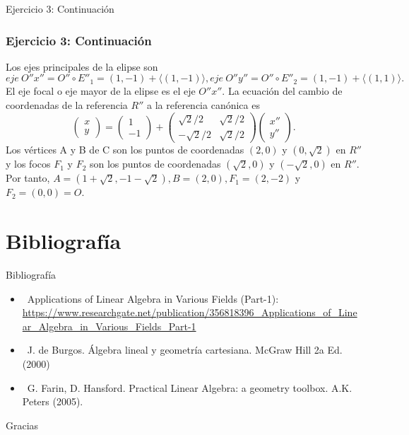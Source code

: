 \documentclass[xcolor={dvipsnames},aspectratio=169,10pt]{beamer}
\begin{document}
\begin{frame}{Ejercicio 3: Continuación}
  \frametitle{Ejercicio 3: Continuación}
    Los ejes principales de la elipse son
    \[eje\ O''x'' = O'' \circ E''_1 = (1, -1) + \langle(1, -1)\rangle, eje\ O''y'' = O'' \circ E''_2 = (1, -1) + \langle(1, 1)\rangle.\]
    El eje focal o eje mayor de la elipse es el eje $O''x''$. La ecuación del cambio de coordenadas de la referencia $R''$ a la referencia canónica es
    \[\begin{pmatrix} x \\ y \end{pmatrix} = \begin{pmatrix} 1 \\ -1 \end{pmatrix} + \begin{pmatrix} \sqrt{2}/2 & \sqrt{2}/2 \\ -\sqrt{2}/2 & \sqrt{2}/2 \end{pmatrix} \begin{pmatrix} x'' \\ y'' \end{pmatrix}.\]
    Los vértices A y B de C son los puntos de coordenadas $(2, 0)$ y $(0, \sqrt{2})$ en $R''$ y los focos $F_1$ y $F_2$ son los puntos de coordenadas $(\sqrt{2}, 0)$ y $(-\sqrt{2}, 0)$ en $R''$. Por tanto, $A = (1 + \sqrt{2}, -1 - \sqrt{2}), B = (2, 0), F_1 = (2, -2)$ y $F_2 = (0, 0) = O$.
\end{frame}

\section{Bibliografía}

\begin{frame}{Bibliografía}
  \begin{itemize}
    \item \faGlobe\, Applications of Linear Algebra in Various Fields (Part-1): \url{https://www.researchgate.net/publication/356818396_Applications_of_Linear_Algebra_in_Various_Fields_Part-1}
    \item \faBook\, J. de Burgos. Álgebra lineal y geometría cartesiana. McGraw Hill 2a Ed. (2000)
    \item \faBook\, G. Farin, D. Hansford. Practical Linear Algebra: a geometry toolbox. A.K. Peters (2005).
  \end{itemize}
\end{frame}

\begin{frame}[standout]
  Gracias \\
\end{frame}
\end{document}
